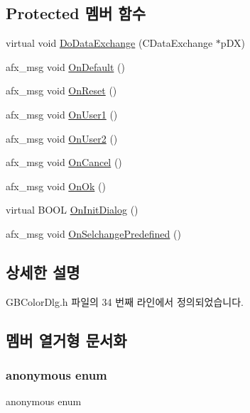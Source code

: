 \subsection*{Protected 멤버 함수}
\begin{DoxyCompactItemize}
\item 
virtual void \mbox{\hyperlink{class_g_b_color_dlg_ab1cf7d47e5c9154f6ca742678242f861}{Do\+Data\+Exchange}} (C\+Data\+Exchange $\ast$p\+DX)
\item 
afx\+\_\+msg void \mbox{\hyperlink{class_g_b_color_dlg_ae38cfe6c74e0cc3d920a05567fd02581}{On\+Default}} ()
\item 
afx\+\_\+msg void \mbox{\hyperlink{class_g_b_color_dlg_adab1ec84eb5ffdf0489cfe025d01ea7b}{On\+Reset}} ()
\item 
afx\+\_\+msg void \mbox{\hyperlink{class_g_b_color_dlg_a2648ec830505581e9268be52c4136df6}{On\+User1}} ()
\item 
afx\+\_\+msg void \mbox{\hyperlink{class_g_b_color_dlg_a932281a7e5ed6c1e816dff7403d1ee2e}{On\+User2}} ()
\item 
afx\+\_\+msg void \mbox{\hyperlink{class_g_b_color_dlg_ab17b13356eebe33676cd07b8b6c75d8c}{On\+Cancel}} ()
\item 
afx\+\_\+msg void \mbox{\hyperlink{class_g_b_color_dlg_a8e5665fcb4b77352198f77936b53190d}{On\+Ok}} ()
\item 
virtual B\+O\+OL \mbox{\hyperlink{class_g_b_color_dlg_a376d61164a4ef4b8a60a0a3297e5470e}{On\+Init\+Dialog}} ()
\item 
afx\+\_\+msg void \mbox{\hyperlink{class_g_b_color_dlg_aa2227421c4564023d2ded8198b2194d3}{On\+Selchange\+Predefined}} ()
\end{DoxyCompactItemize}


\subsection{상세한 설명}


G\+B\+Color\+Dlg.\+h 파일의 34 번째 라인에서 정의되었습니다.



\subsection{멤버 열거형 문서화}
\mbox{\label{class_g_b_color_dlg_a0521b97d21035c132d3dba9bc818837a}} 
\subsubsection{\texorpdfstring{anonymous enum}{anonymous enum}}
{\footnotesize\ttfamily anonymous enum}

